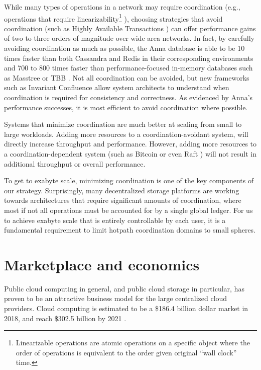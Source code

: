 \documentclass[11pt,fleqn,openany]{book}
\begin{document}
While many types of operations in a network may require coordination
(e.g., operations that require linearizability\footnote{
Linearizable operations are atomic operations on a specific object where
the order of operations is equivalent to the order given original ``wall clock''
time.
}
\cite{jepsen-consistency, hat, vv-consistency}), choosing strategies that
avoid coordination (such as Highly Available Transactions \cite{hat}) can offer
performance gains of two to three orders of magnitude over wide area networks.
In fact, by carefully avoiding coordination as much as possible, the Anna
database is able to be 10 times faster than both Cassandra and Redis in their
corresponding environments and 700 to 800 times faster than
performance-focused in-memory databases such as Masstree or TBB
\cite{anna, anna-announce}.
Not all coordination can be avoided, but new frameworks such as Invariant
Confluence \cite{i-confluence} allow system architects to understand when
coordination is required for consistency and correctness. As evidenced
by Anna's performance successes, it is most efficient to avoid coordination
where possible.

Systems that minimize coordination are
much better at scaling from small
to large workloads. Adding more resources to a coordination-avoidant system,
will directly increase throughput and performance. However,
adding more resources to a coordination-dependent system
(such as Bitcoin \cite{bitcoin} or even Raft \cite{raft}) will not result in
additional throughput or overall performance.

To get to exabyte scale, minimizing coordination is one of the key components
of our strategy.
Surprisingly, many decentralized storage platforms are working towards
architectures that require significant amounts of coordination,
where most if not all operations must be accounted for by a single global
ledger. For us to achieve exabyte scale that is entirely controllable by each user, it is a fundamental requirement to limit hotpath coordination domains to small spheres.

\section{Marketplace and economics}

Public cloud computing in general, and public cloud storage in particular, has
proven to be an attractive business model for the large centralized cloud
providers. Cloud computing is estimated to be a \$186.4 billion dollar market
in 2018, and reach \$302.5 billion by 2021 \cite{gartner-cloud-growth}.
\end{document}
